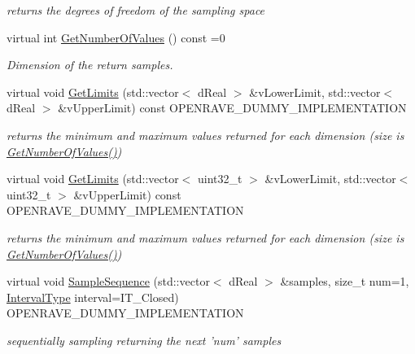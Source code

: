 \begin{DoxyCompactItemize}
\begin{DoxyCompactList}\small\item\em returns the degrees of freedom of the sampling space \item\end{DoxyCompactList}\item 
virtual int \hyperlink{classOpenRAVE_1_1SpaceSamplerBase_a1c2746b270bee7389df0b315a18a719c}{GetNumberOfValues} () const =0
\begin{DoxyCompactList}\small\item\em Dimension of the return samples. \item\end{DoxyCompactList}\item 
virtual void \hyperlink{classOpenRAVE_1_1SpaceSamplerBase_a01de3c15828fffc3e8fde1384735f428}{GetLimits} (std::vector$<$ dReal $>$ \&vLowerLimit, std::vector$<$ dReal $>$ \&vUpperLimit) const OPENRAVE\_\-DUMMY\_\-IMPLEMENTATION
\begin{DoxyCompactList}\small\item\em returns the minimum and maximum values returned for each dimension (size is \hyperlink{classOpenRAVE_1_1SpaceSamplerBase_a1c2746b270bee7389df0b315a18a719c}{GetNumberOfValues()}) \item\end{DoxyCompactList}\item 
virtual void \hyperlink{classOpenRAVE_1_1SpaceSamplerBase_afb999fb02a4ba0107783be362f3ec6fe}{GetLimits} (std::vector$<$ uint32\_\-t $>$ \&vLowerLimit, std::vector$<$ uint32\_\-t $>$ \&vUpperLimit) const OPENRAVE\_\-DUMMY\_\-IMPLEMENTATION
\begin{DoxyCompactList}\small\item\em returns the minimum and maximum values returned for each dimension (size is \hyperlink{classOpenRAVE_1_1SpaceSamplerBase_a1c2746b270bee7389df0b315a18a719c}{GetNumberOfValues()}) \item\end{DoxyCompactList}\item 
virtual void \hyperlink{classOpenRAVE_1_1SpaceSamplerBase_ac7edf671cbb636f75edb247680ea6a87}{SampleSequence} (std::vector$<$ dReal $>$ \&samples, size\_\-t num=1, \hyperlink{namespaceOpenRAVE_a0d04dbfb6240509e26f8336ab1756937}{IntervalType} interval=IT\_\-Closed) OPENRAVE\_\-DUMMY\_\-IMPLEMENTATION
\begin{DoxyCompactList}\small\item\em sequentially sampling returning the next 'num' samples \item\end{DoxyCompactList}\item 

\end{DoxyCompactItemize}
